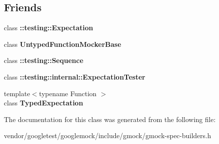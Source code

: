 \subsection*{Friends}
\begin{DoxyCompactItemize}
\item 
class {\bfseries \+::testing\+::\+Expectation}\hypertarget{classtesting_1_1internal_1_1ExpectationBase_a86fa3dccdc465d897ee321b74e4ce915}{}\label{classtesting_1_1internal_1_1ExpectationBase_a86fa3dccdc465d897ee321b74e4ce915}

\item 
class {\bfseries Untyped\+Function\+Mocker\+Base}\hypertarget{classtesting_1_1internal_1_1ExpectationBase_a3e5598b244ec7673d0a494477d71e559}{}\label{classtesting_1_1internal_1_1ExpectationBase_a3e5598b244ec7673d0a494477d71e559}

\item 
class {\bfseries \+::testing\+::\+Sequence}\hypertarget{classtesting_1_1internal_1_1ExpectationBase_aeaf43a487a21c0ac1135b094a1561056}{}\label{classtesting_1_1internal_1_1ExpectationBase_aeaf43a487a21c0ac1135b094a1561056}

\item 
class {\bfseries \+::testing\+::internal\+::\+Expectation\+Tester}\hypertarget{classtesting_1_1internal_1_1ExpectationBase_a83859ffda7f75bb8b447063eb53cb8b8}{}\label{classtesting_1_1internal_1_1ExpectationBase_a83859ffda7f75bb8b447063eb53cb8b8}

\item 
{\footnotesize template$<$typename Function $>$ }\\class {\bfseries Typed\+Expectation}\hypertarget{classtesting_1_1internal_1_1ExpectationBase_a4f17de55396a8ef740d5ad2b1380a851}{}\label{classtesting_1_1internal_1_1ExpectationBase_a4f17de55396a8ef740d5ad2b1380a851}

\end{DoxyCompactItemize}


The documentation for this class was generated from the following file\+:\begin{DoxyCompactItemize}
\item 
vendor/googletest/googlemock/include/gmock/gmock-\/spec-\/builders.\+h\end{DoxyCompactItemize}
